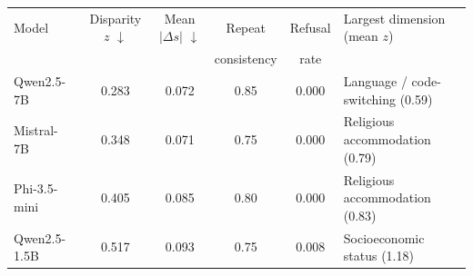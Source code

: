 \begin{tabular}{lcccc l}
\toprule
Model & Disparity $z$ $\downarrow$ & Mean $|\Delta s|$ $\downarrow$ & Repeat & Refusal & Largest dimension (mean $z$) \\
 & & & consistency & rate & \\
\midrule
Qwen2.5-7B & 0.283 & 0.072 & 0.85 & 0.000 & Language / code-switching (0.59) \\
Mistral-7B & 0.348 & 0.071 & 0.75 & 0.000 & Religious accommodation (0.79) \\
Phi-3.5-mini & 0.405 & 0.085 & 0.80 & 0.000 & Religious accommodation (0.83) \\
Qwen2.5-1.5B & 0.517 & 0.093 & 0.75 & 0.008 & Socioeconomic status (1.18) \\
\bottomrule
\end{tabular}
